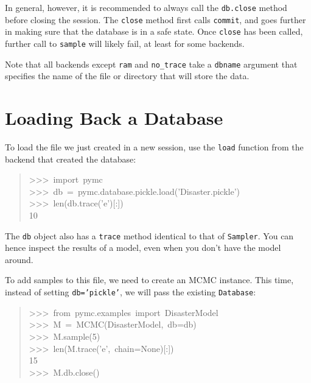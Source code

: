 In general, however, it is recommended to always call the \texttt{db.close} method
before closing the session. The \texttt{close} method first calls \texttt{commit}, and
goes further in making sure that the database is in a safe state. Once \texttt{close}
has been called, further call to \texttt{sample} will likely fail, at least
for some backends.
\begin{center}\begin{sffamily}
\end{sffamily}
\end{center}

Note that all backends except \texttt{ram} and \texttt{no{\_}trace} take a \texttt{dbname} argument that
specifies the name of the file or directory that will store the data.



\hypertarget{loading-back-a-database}{}
\section*{Loading Back a Database}
\label{loading-back-a-database}

To load the file we just created in a new session, use the \texttt{load} function
from the backend that created the database:
\begin{quote}{\ttfamily \raggedright \noindent
>{}>{}>~import~pymc~\\
>{}>{}>~db~=~pymc.database.pickle.load('Disaster.pickle')~\\
>{}>{}>~len(db.trace('e'){[}:{]})~\\
10
}\end{quote}

The \texttt{db} object also has a \texttt{trace} method identical to that of \texttt{Sampler}.
You can hence inspect the results of a model, even when you don't have the model
around.

To add samples to this file, we need to create an MCMC instance. This time,
instead of setting \texttt{db='pickle'}, we will pass the existing \texttt{Database}:
\begin{quote}{\ttfamily \raggedright \noindent
>{}>{}>~from~pymc.examples~import~DisasterModel~\\
>{}>{}>~M~=~MCMC(DisasterModel,~db=db)~\\
>{}>{}>~M.sample(5)~\\
>{}>{}>~len(M.trace('e',~chain=None){[}:{]})~\\
15~\\
>{}>{}>~M.db.close()
}\end{quote}


